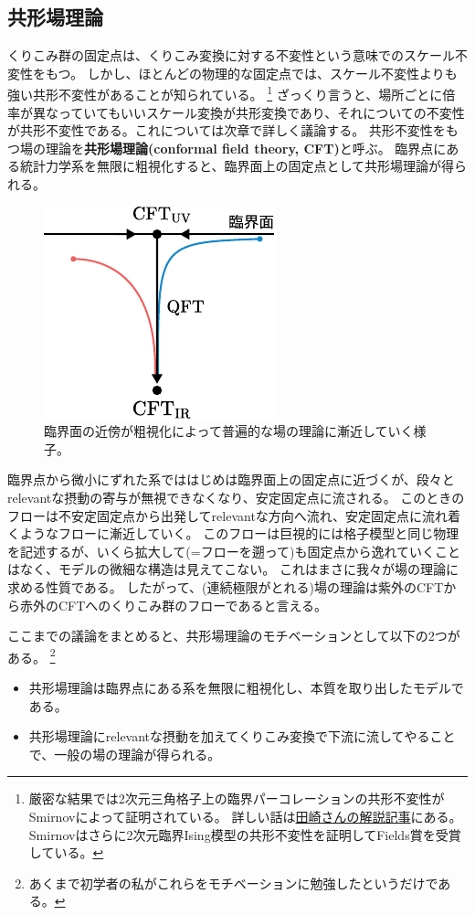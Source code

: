 \documentclass[\main/main.tex]{subfiles}
\begin{document}
\subsection{
    共形場理論
}
くりこみ群の固定点は、くりこみ変換に対する不変性という意味でのスケール不変性をもつ。
しかし、ほとんどの物理的な固定点では、スケール不変性よりも強い共形不変性があることが知られている。
\footnote{
    厳密な結果では2次元三角格子上の臨界パーコレーションの共形不変性がSmirnovによって証明されている。
    詳しい話は\href{https://www.gakushuin.ac.jp/~881791/pdf/suuriPercolation.pdf}{田崎さんの解説記事}にある。
    Smirnovはさらに2次元臨界Ising模型の共形不変性を証明してFields賞を受賞している。
}
ざっくり言うと、場所ごとに倍率が異なっていてもいいスケール変換が共形変換であり、それについての不変性が共形不変性である。これについては次章で詳しく議論する。
共形不変性をもつ場の理論を\textbf{共形場理論(conformal field theory, CFT)}と呼ぶ。
臨界点にある統計力学系を無限に粗視化すると、臨界面上の固定点として共形場理論が得られる。
\begin{figure}[H]
    \centering
    \includegraphics[width=0.4\hsize]{CFT_to_CFT.pdf}
    \caption{臨界面の近傍が粗視化によって普遍的な場の理論に漸近していく様子。}
\end{figure}
臨界点から微小にずれた系でははじめは臨界面上の固定点に近づくが、段々とrelevantな摂動の寄与が無視できなくなり、安定固定点に流される。
このときのフローは不安定固定点から出発してrelevantな方向へ流れ、安定固定点に流れ着くようなフローに漸近していく。
このフローは巨視的には格子模型と同じ物理を記述するが、いくら拡大して(=フローを遡って)も固定点から逸れていくことはなく、モデルの微細な構造は見えてこない。
これはまさに我々が場の理論に求める性質である。
したがって、(連続極限がとれる)場の理論は紫外のCFTから赤外のCFTへのくりこみ群のフローであると言える。

ここまでの議論をまとめると、共形場理論のモチベーションとして以下の2つがある。
\footnote{
    あくまで初学者の私がこれらをモチベーションに勉強したというだけである。
}
\begin{itemize}
    \item 共形場理論は臨界点にある系を無限に粗視化し、本質を取り出したモデルである。
    \item 共形場理論にrelevantな摂動を加えてくりこみ変換で下流に流してやることで、一般の場の理論が得られる。
\end{itemize}
\end{document}
